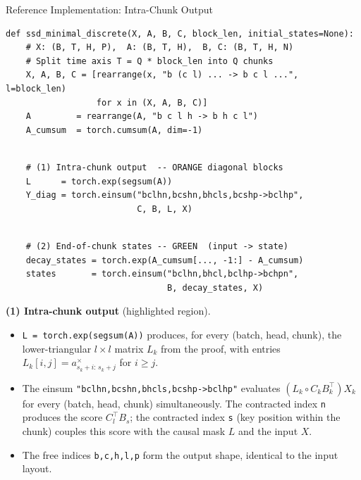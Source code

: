 \begin{frame}[fragile]{Reference Implementation: Intra-Chunk Output}

\begin{lstlisting}[aboveskip=0pt,belowskip=0pt,frame=none,backgroundcolor=\color{mambagray!10}]
def ssd_minimal_discrete(X, A, B, C, block_len, initial_states=None):
    # X: (B, T, H, P),  A: (B, T, H),  B, C: (B, T, H, N)
    # Split time axis T = Q * block_len into Q chunks
    X, A, B, C = [rearrange(x, "b (c l) ... -> b c l ...", l=block_len)
                  for x in (X, A, B, C)]
    A         = rearrange(A, "b c l h -> b h c l")
    A_cumsum  = torch.cumsum(A, dim=-1)
\end{lstlisting}
\begin{lstlisting}[aboveskip=0pt,belowskip=0pt,frame=none,backgroundcolor=\color{orange!18}]

    # (1) Intra-chunk output  -- ORANGE diagonal blocks
    L      = torch.exp(segsum(A))
    Y_diag = torch.einsum("bclhn,bcshn,bhcls,bcshp->bclhp",
                          C, B, L, X)
\end{lstlisting}
\begin{lstlisting}[aboveskip=0pt,belowskip=0pt,frame=none,backgroundcolor=\color{mambagray!10}]

    # (2) End-of-chunk states -- GREEN  (input -> state)
    decay_states = torch.exp(A_cumsum[..., -1:] - A_cumsum)
    states       = torch.einsum("bclhn,bhcl,bclhp->bchpn",
                                B, decay_states, X)
\end{lstlisting}

  \vspace{0.3em}
  \textbf{(1) Intra-chunk output} (highlighted region).
  \begin{itemize}\itemsep1pt
    \item \texttt{L = torch.exp(segsum(A))} produces, for every (batch, head, chunk), the lower-triangular $l \times l$ matrix $L_k$ from the proof, with entries $L_k[i,j] = a^\times_{s_k+i:\,s_k+j}$ for $i \ge j$.
    \item The einsum \texttt{"bclhn,bcshn,bhcls,bcshp->bclhp"} evaluates $(L_k \circ C_k B_k^{\!\top}) X_k$ for every (batch, head, chunk) simultaneously. The contracted index \texttt{n} produces the score $C_l^{\!\top} B_s$; the contracted index \texttt{s} (key position within the chunk) couples this score with the causal mask $L$ and the input $X$.
    \item The free indices \texttt{b,c,h,l,p} form the output shape, identical to the input layout.
  \end{itemize}
\end{frame}

